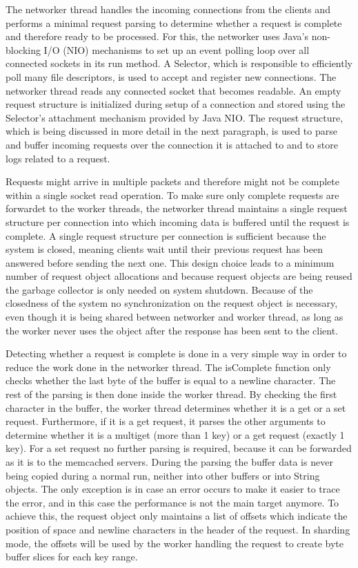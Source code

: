 \documentclass[11pt,a4paper]{article}
\begin{document}
The networker thread handles the incoming connections from the clients and performs a minimal request parsing to determine whether a request is complete and therefore ready to be processed.
For this, the networker uses Java's non-blocking I/O (NIO) mechanisms to set up an event polling loop over all connected sockets in its run method.
A Selector, which is responsible to efficiently poll many file descriptors, is used to accept and register new connections.
The networker thread reads any connected socket that becomes readable.
An empty request structure is initialized during setup of a connection and stored using the Selector's attachment mechanism provided by Java NIO.
The request structure, which is being discussed in more detail in the next paragraph, is used to parse and buffer incoming requests over the connection it is attached to and to store logs related to a request.

Requests might arrive in multiple packets and therefore might not be complete within a single socket read operation.
To make sure only complete requests are forwardet to the worker threads, the networker thread maintains a single request structure per connection into which incoming data is buffered until the request is complete.
A single request structure per connection is sufficient because the system is closed, meaning clients wait until their previous request has been answered before sending the next one.
This design choice leads to a minimum number of request object allocations and because request objects are being reused the garbage collector is only needed on system shutdown.
Because of the closedness of the system no synchronization on the request object is necessary, even though it is being shared between networker and worker thread, as long as the worker never uses the object after the response has been sent to the client.

Detecting whether a request is complete is done in a very simple way in order to reduce the work done in the networker thread.
The isComplete function only checks whether the last byte of the buffer is equal to a newline character.
The rest of the parsing is then done inside the worker thread. By checking the first character in the buffer, the worker thread determines whether it is a get or a set request.
Furthermore, if it is a get request, it parses the other arguments to determine whether it is a multiget (more than 1 key) or a get request (exactly 1 key).
For a set request no further parsing is required, because it can be forwarded as it is to the memcached servers.
During the parsing the buffer data is never being copied during a normal run, neither into other buffers or into String objects.
The only exception is in case an error occurs to make it easier to trace the error, and in this case the performance is not the main target anymore.
To achieve this, the request object only maintains a list of offsets which indicate the position of space and newline characters in the header of the request.
In sharding mode, the offsets will be used by the worker handling the request to create byte buffer slices for each key range.
\end{document}
